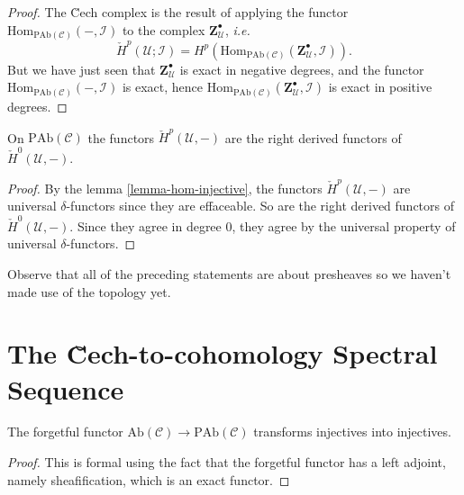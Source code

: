 \begin{proof}
The \u Cech complex is the result of applying the functor 
$\text{Hom}_{\text{PAb}(\mathcal{C})}(-, \mathcal{I}) $ to the complex $ 
\mathbf{Z}^\bullet_\mathcal{U} $, {\it i.e.}
$$
\check H^p(\mathcal{U} ; \mathcal{I}) = H^p 
(\text{Hom}_{\text{PAb}(\mathcal{C})} (\mathbf{Z}^\bullet_\mathcal{U}, 
\mathcal{I})).
$$
But we have just seen that $\mathbf{Z}^\bullet_\mathcal{U}$ is exact in 
negative degrees, and the functor $\text{Hom}_{\text{PAb}(\mathcal{C})}(-, 
\mathcal{I})$ is exact, hence $\text{Hom}_{\text{PAb}(\mathcal{C})} 
(\mathbf{Z}^\bullet_\mathcal{U}, \mathcal{I})$ is exact in positive degrees.
\end{proof}
  
\begin{theorem}
\label{theorem-cech-derived}
On $\text{PAb}(\mathcal{C})$ the functors $\check{H}^p(\mathcal{U}, -)$ are 
the right derived functors of $\check{H}^0(\mathcal{U}, -)$.  
\end{theorem}
  
\begin{proof}
By the lemma \ref{lemma-hom-injective}, the functors $\check 
H^p(\mathcal{U}, -)$ are universal $\delta$-functors since they are effaceable. 
So are the right derived functors of $\check H^0(\mathcal{U}, -)$.  Since they 
agree in degree $0$, they agree by the universal property of universal 
$\delta$-functors.
\end{proof}

\begin{remark}
\label{remark-presheaves-no-topology}
Observe that all of the preceding statements are about presheaves so we haven't 
made use of the topology yet. 
\end{remark}




\section{The \u Cech-to-cohomology Spectral Sequence}
\label{section-cech-ss}


\begin{lemma}
\label{lemma-forget-injectives}
The forgetful functor $\text{Ab}(\mathcal{C})\to \text{PAb}(\mathcal{C})$ 
transforms injectives into injectives.  
\end{lemma}
  
\begin{proof}
This is formal using the fact that the forgetful functor has a left adjoint, 
namely sheafification, which is an exact functor. 
\end{proof}

